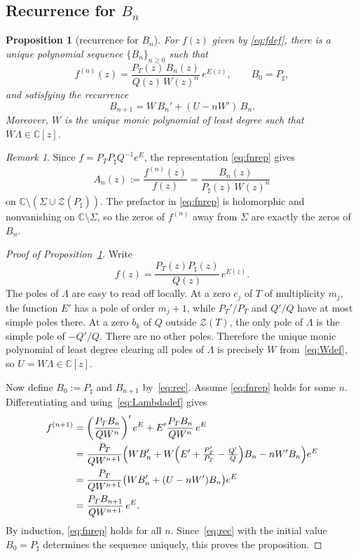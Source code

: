 \documentclass[reqno]{article}
\newtheorem{prop}[theorem]{Proposition}
\theoremstyle{definition}
\theoremstyle{remark}
\newtheorem{remark}[theorem]{Remark}
\theoremstyle{plain}
\newcommand{\C}{\mathbb C}
\newcommand{\Z}{\mathcal Z}
\begin{document}
\subsection{Recurrence for \texorpdfstring{$B_n$}{B\_n}}

\begin{prop}[recurrence for \(B_n\)]\label{prop:rec}
For $f(z)$ given by \eqref{eq:fdef}, there is a unique polynomial sequence $\{B_n\}_{n\ge0}$ such that
\begin{equation}\label{eq:fnrep}
f^{(n)}(z)=\frac{P_T(z)\,B_n(z)}{Q(z)\,W(z)^n}\,e^{E(z)},\qquad B_0=P_\sharp,
\end{equation}
and satisfying the recurrence
\begin{equation}\label{eq:rec}
B_{n+1}=W\,B_n'+(U-nW')\,B_n.
\end{equation}
Moreover, $W$ is the unique monic polynomial of least degree such that $W\Lambda\in\C[z]$.
\end{prop}

\begin{remark}
Since $f=P_T P_\sharp Q^{-1}e^E$, the representation \eqref{eq:fnrep} gives
\begin{equation}\label{eq:Anrep}
A_n(z):=\frac{f^{(n)}(z)}{f(z)}=\frac{B_n(z)}{P_\sharp(z)\,W(z)^n}
\end{equation}
on $\C\setminus(\Sigma\cup \Z(P_\sharp))$. The prefactor in \eqref{eq:fnrep} is holomorphic and nonvanishing on $\C\setminus\Sigma$, so the zeros of $f^{(n)}$ away from $\Sigma$ are exactly the zeros of $B_n$.
\end{remark}

\begin{proof}[Proof of Proposition~\ref{prop:rec}]
Write
$$f(z)=\frac{P_T(z)P_\sharp(z)}{Q(z)}\,e^{E(z)}.$$
The poles of $\Lambda$ are easy to read off locally. At a zero $c_j$ of $T$ of multiplicity $m_j$, the function $E'$ has a pole of order $m_j+1$, while $P_T'/P_T$ and $Q'/Q$ have at most simple poles there. At a zero $b_k$ of $Q$ outside $\Z(T)$, the only pole of $\Lambda$ is the simple pole of $-Q'/Q$. There are no other poles. Therefore the unique monic polynomial of least degree clearing all poles of $\Lambda$ is precisely $W$ from~\eqref{eq:Wdef}, so $U=W\Lambda\in\C[z]$.

Now define $B_0:=P_\sharp$ and $B_{n+1}$ by~\eqref{eq:rec}. Assume \eqref{eq:fnrep} holds for some $n$. Differentiating and using~\eqref{eq:Lambdadef} gives
\begin{align*}
f^{(n+1)}
&=\left(\frac{P_T B_n}{Q W^n}\right)'e^E+E'\frac{P_T B_n}{Q W^n}\,e^E \\
&=\frac{P_T}{Q W^{n+1}}\Bigl(W B_n'+W\Bigl(E'+\tfrac{P_T'}{P_T}-\tfrac{Q'}{Q}\Bigr)B_n-nW'B_n\Bigr)e^E \\
&=\frac{P_T}{Q W^{n+1}}\bigl(WB_n'+(U-nW')B_n\bigr)e^E \\
&=\frac{P_T B_{n+1}}{Q W^{n+1}}\,e^E.
\end{align*}
By induction, \eqref{eq:fnrep} holds for all $n$. Since~\eqref{eq:rec} with the initial value $B_0=P_\sharp$ determines the sequence uniquely, this proves the proposition.\qedhere
\end{proof}
\end{document}
